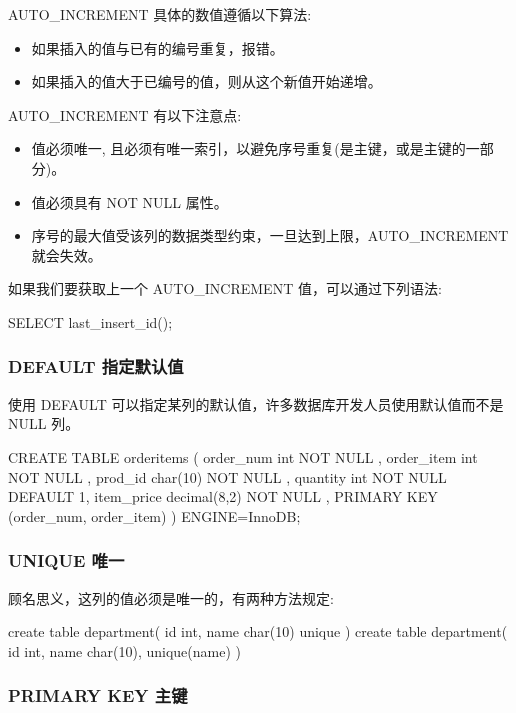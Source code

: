 AUTO\_INCREMENT 具体的数值遵循以下算法:
\begin{itemize}
    \item 如果插入的值与已有的编号重复，报错。
    \item 如果插入的值大于已编号的值，则从这个新值开始递增。
\end{itemize}

AUTO\_INCREMENT 有以下注意点:
\begin{itemize}
    \item 值必须唯一, 且必须有唯一索引，以避免序号重复(是主键，或是主键的一部分)。
    \item 值必须具有 NOT NULL 属性。
    \item 序号的最大值受该列的数据类型约束，一旦达到上限，AUTO\_INCREMENT就会失效。
\end{itemize}

如果我们要获取上一个 AUTO\_INCREMENT 值，可以通过下列语法:
\begin{sql}
SELECT last_insert_id();
\end{sql}

\subsubsection{DEFAULT 指定默认值}

使用 DEFAULT 可以指定某列的默认值，许多数据库开发人员使用默认值而不是 NULL 列。

\begin{sql}
CREATE TABLE orderitems (
  order_num  int          NOT NULL ,
  order_item int          NOT NULL ,
  prod_id    char(10)     NOT NULL ,
  quantity   int          NOT NULL  DEFAULT 1,
  item_price decimal(8,2) NOT NULL ,
  PRIMARY KEY (order_num, order_item)
) ENGINE=InnoDB;
\end{sql}

\subsubsection{UNIQUE 唯一}

顾名思义，这列的值必须是唯一的，有两种方法规定:

\begin{sql}
create table department(
    id int,
    name char(10) unique
)
create table department(
    id int,
    name char(10),
    unique(name)
)
\end{sql}

\subsubsection{PRIMARY KEY 主键}

